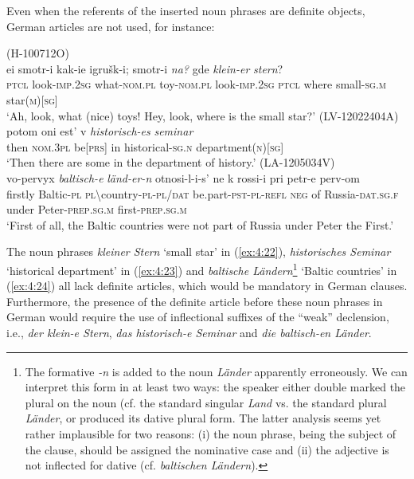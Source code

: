 \noindent Even when the referents of the inserted noun phrases are definite objects, German articles are not used, for instance:

\ea
\label{ex:4:22}
(H-100712O)\\
\gll ei  smotr-i kak-ie igrušk-i; smotr-i \textit{na?}  gde \textit{klein-er} \textit{stern}?\\
 \textsc{ptcl} look-\textsc{imp.2sg} what-\textsc{nom.pl} toy-\textsc{nom.pl} look-\textsc{imp.2sg} \textsc{ptcl} where small-\textsc{sg.m} star(\textsc{m})[\textsc{sg}]\\
\glt `Ah, look, what (nice) toys! Hey, look, where is the small star?'
\ex
\label{ex:4:23}
(LV-12022404A)\\
\gll potom oni est' v \textit{historisch-es} \textit{seminar}\\
 then \textsc{nom.3pl} be[\textsc{prs}] in historical-\textsc{sg.n} department(\textsc{n})[\textsc{sg}]\\
\glt `Then there are some in the department of history.'
\ex
\label{ex:4:24}
(LA-1205034V)\\
 \gll vo-pervyx \textit{baltisch-e} \textit{länd-er-n}  otnosi-l-i-s' ne k rossi-i pri petr-e perv-om\\
 firstly Baltic-\textsc{pl} \textsc{pl}\textbackslash{}country-\textsc{pl-pl/dat} be.part-\textsc{pst-pl-refl} \textsc{neg} of Russia-\textsc{dat.sg.f} under Peter-\textsc{prep.sg.m} first-\textsc{prep.sg.m}\\
\glt `First of all, the Baltic countries were not part of Russia under Peter the First.'

\z

\noindent The noun phrases \textit{kleiner Stern} `small star' in (\ref{ex:4:22}), \textit{historisches Seminar} `historical department' in (\ref{ex:4:23}) and \textit{baltische Ländern}\footnote{The formative \textit {-n} is added to the noun \textit{Länder} apparently erroneously. We can interpret this form in at least two ways: the speaker either double marked the plural on the noun (cf. the standard singular \textit{Land} vs. the standard plural \textit{Länder}, or produced its dative plural form. The latter analysis seems yet rather implausible for two reasons: (i) the noun phrase, being the subject of the clause, should be assigned the nominative case and (ii) the adjective is not inflected for dative  (cf. \textit{baltischen Ländern}).} `Baltic countries' in (\ref{ex:4:24}) all lack definite articles, which would be mandatory in German clauses. Furthermore, the presence of the definite article before these noun phrases in German would require the use of inflectional suffixes of the ``weak'' declension, i.e., \textit{der klein-e Stern}, \textit{das historisch-e Seminar} and \textit{die baltisch-en Länder}. 

